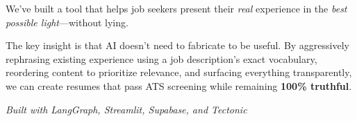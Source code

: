 \documentclass[12pt, a4paper]{article}
\begin{document}
\bigskip

We've built a tool that helps job seekers present their \textit{real} experience in the \textit{best possible light}---without lying.

\bigskip

The key insight is that AI doesn't need to fabricate to be useful. By aggressively rephrasing existing experience using a job description's exact vocabulary, reordering content to prioritize relevance, and surfacing everything transparently, we can create resumes that pass ATS screening while remaining \textbf{100\% truthful}.

\vfill

\begin{center}
\textit{Built with LangGraph, Streamlit, Supabase, and Tectonic}
\end{center}
\end{document}

